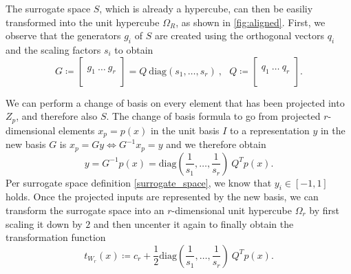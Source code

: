 \documentclass[
  a4paper,  %
  twoside,  %
  bibliography=totoc,
  headsepline,
  cleardoublepage=empty,
  parskip=half,
  draft=false
]{scrbook}
\begin{document}
The surrogate space $S$, which is already a hypercube, can then be easiliy transformed into the unit hypercube $\Omega_R$, as shown in \cref{fig:aligned}.
First, we observe that the generators $g_i$ of $S$ are created using the orthogonal vectors $q_i$ and the scaling factors $s_i$ to obtain
\begin{equation}
G \coloneqq \begin{bmatrix}
  \\
    g_1 ~ \dots  ~ g_r\\
    \\
  \end{bmatrix}=Q ~ \text{diag}(s_1, \dots, s_r) ~, ~~~
Q \coloneqq \begin{bmatrix}
  \\
    q_1 ~ \dots  ~ q_r\\
    \\
  \end{bmatrix}.
\end{equation}

We can perform a change of basis on every element that has been projected into $Z_p$, and therefore also $S$.
The change of basis formula to go from projected $r$-dimensional elements $x_p=p(x)$ in the unit basis $I$ to a representation $y$ in the new basis $G$ is $x_p=Gy \Leftrightarrow G^{-1} x_p=y$ and we therefore obtain
\begin{equation}
y=G^{-1} p(x)=\text{diag}\left(\frac{1}{s_1}, \dots, \frac{1}{s_r}\right) ~Q^T p(x).
\label{alignment}
\end{equation}
Per surrogate space definition \cref{surrogate_space}, we know that $y_i \in [-1,1]$ holds.
Once the projected inputs are represented by the new basis, we can transform the surrogate space into an $r$-dimensional unit hypercube $\Omega_r$ by first scaling it down by $2$ and then uncenter it again to finally obtain the transformation function
\begin{equation}
t_{W_r}(x) \coloneqq c_r + \frac{1}{2} \text{diag}\left(\frac{1}{s_1}, \dots, \frac{1}{s_r}\right) ~Q^T p(x).
\label{linear_trans}
\end{equation}
\end{document}
